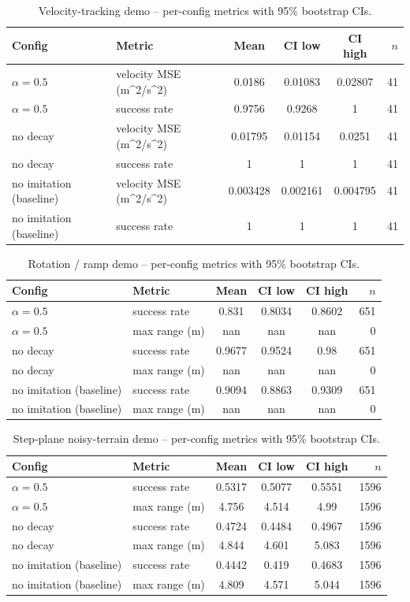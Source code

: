\begin{table}[ht]
\centering
\caption{Velocity-tracking demo -- per-config metrics with 95\% bootstrap CIs.}
\label{tab:vel_diff}
\begin{tabular}{llcccr}
\toprule
Config & Metric & Mean & CI low & CI high & $n$ \\
\midrule
$\alpha = 0.5$ & velocity MSE (m^2/s^2) & 0.0186 & 0.01083 & 0.02807 & 41 \\
$\alpha = 0.5$ & success rate & 0.9756 & 0.9268 & 1 & 41 \\
no decay & velocity MSE (m^2/s^2) & 0.01795 & 0.01154 & 0.0251 & 41 \\
no decay & success rate & 1 & 1 & 1 & 41 \\
no imitation (baseline) & velocity MSE (m^2/s^2) & 0.003428 & 0.002161 & 0.004795 & 41 \\
no imitation (baseline) & success rate & 1 & 1 & 1 & 41 \\
\bottomrule
\end{tabular}
\end{table}

\begin{table}[ht]
\centering
\caption{Rotation / ramp demo -- per-config metrics with 95\% bootstrap CIs.}
\label{tab:rotation}
\begin{tabular}{llcccr}
\toprule
Config & Metric & Mean & CI low & CI high & $n$ \\
\midrule
$\alpha = 0.5$ & success rate & 0.831 & 0.8034 & 0.8602 & 651 \\
$\alpha = 0.5$ & max range (m) & nan & nan & nan & 0 \\
no decay & success rate & 0.9677 & 0.9524 & 0.98 & 651 \\
no decay & max range (m) & nan & nan & nan & 0 \\
no imitation (baseline) & success rate & 0.9094 & 0.8863 & 0.9309 & 651 \\
no imitation (baseline) & max range (m) & nan & nan & nan & 0 \\
\bottomrule
\end{tabular}
\end{table}

\begin{table}[ht]
\centering
\caption{Step-plane noisy-terrain demo -- per-config metrics with 95\% bootstrap CIs.}
\label{tab:noisy}
\begin{tabular}{llcccr}
\toprule
Config & Metric & Mean & CI low & CI high & $n$ \\
\midrule
$\alpha = 0.5$ & success rate & 0.5317 & 0.5077 & 0.5551 & 1596 \\
$\alpha = 0.5$ & max range (m) & 4.756 & 4.514 & 4.99 & 1596 \\
no decay & success rate & 0.4724 & 0.4484 & 0.4967 & 1596 \\
no decay & max range (m) & 4.844 & 4.601 & 5.083 & 1596 \\
no imitation (baseline) & success rate & 0.4442 & 0.419 & 0.4683 & 1596 \\
no imitation (baseline) & max range (m) & 4.809 & 4.571 & 5.044 & 1596 \\
\bottomrule
\end{tabular}
\end{table}

